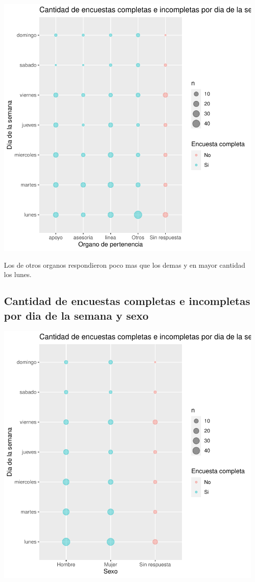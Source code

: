 \documentclass{article}
\begin{document}
\includegraphics{seguimientov3-083}

Los de otros organos respondieron poco mas que los demas y en mayor cantidad los lunes.

\subsection{Cantidad de encuestas completas e incompletas por dia de la semana y sexo}

\includegraphics{seguimientov3-084}
\end{document}
